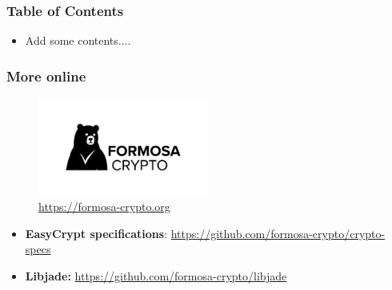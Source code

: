 \begin{frame}
  \frametitle{Table of Contents}
  \begin{itemize}
  \item <1-> Add some contents....
  \end{itemize}
\end{frame}

\begin{frame}
  \frametitle{More online}
  \begin{center}
    \begin{figure}[t]
      \centering
      \includegraphics[width=0.5\textwidth]{formosa}
      \caption*{\Large \url{https://formosa-crypto.org}}
    \end{figure}
  \end{center}
  \vspace*{.5cm}
  \begin{itemize}
  \item \textbf{EasyCrypt specifications}: \url{https://github.com/formosa-crypto/crypto-specs}
  \item \textbf{Libjade:} \url{https://github.com/formosa-crypto/libjade}
  \end{itemize}
\end{frame}

% 

